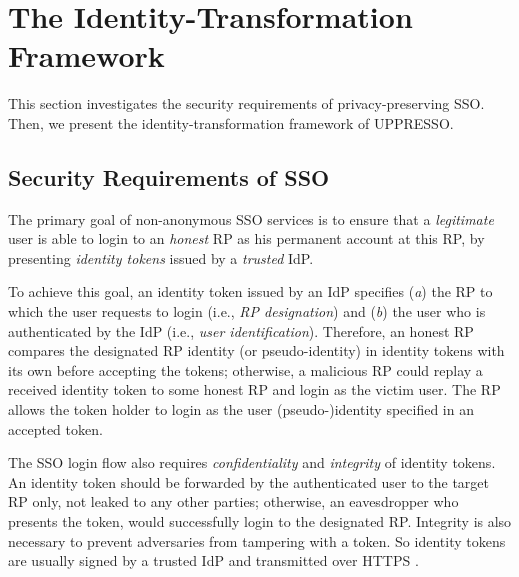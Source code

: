 \section{The Identity-Transformation Framework}
\label{sec:challenge}

This section investigates the security requirements of privacy-preserving SSO.
Then,
    we present the identity-transformation framework of UPPRESSO.


\subsection{Security Requirements of SSO}
\label{subsec:basicrequirements}

The primary goal of non-anonymous SSO services \cite{OpenIDConnect,rfc6749,SAML,SAMLIdentifier,NIST2017draft} is %
 to ensure that a \emph{legitimate} user is able to login to an \emph{honest} RP as his permanent account at this RP, %
    by presenting \emph{identity tokens} issued by a \emph{trusted} IdP.

To achieve this goal,
 an identity token issued by an IdP \cite{OpenIDConnect,rfc6749,SAML,SAMLIdentifier,NIST2017draft} specifies (\emph{a}) the RP to which the user requests to login (i.e., \emph{RP designation})
    and  (\emph{b}) the user who is authenticated by the IdP (i.e., \emph{user identification}).
Therefore,
    an honest RP compares the designated RP identity (or pseudo-identity) in identity tokens with its own before accepting the tokens;
     otherwise,
        a malicious RP could replay a received identity token to some honest RP and login as the victim user.
The RP allows the token holder to login as the user (pseudo-)identity specified in an accepted token.

The SSO login flow also requires \emph{confidentiality} and \emph{integrity} of identity tokens.
An identity token should be forwarded by the authenticated user to the target RP only,
    not leaked to any other parties;
        otherwise, an eavesdropper who presents the token, would successfully login to the designated RP.
Integrity is also necessary
    to prevent adversaries from tampering with a token.
So identity tokens are usually signed by a trusted IdP and transmitted over HTTPS \cite{OpenIDConnect,rfc6749,SAML}.

